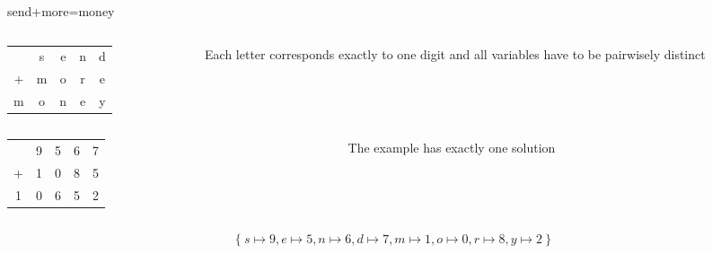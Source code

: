 \begin{frame}[c]{send+more=money}
  \begin{columns}
    \begin{column}{.35\textwidth}
      \begin{tabular}[t]{ccccc}
         &s&e&n&d\\
        +&m&o&r&e\\
        \hline
        m&o&n&e&y
      \end{tabular}
    \end{column}
    \begin{column}{.35\textwidth}
      Each letter corresponds exactly to one digit and all variables have to be
      pairwisely distinct
    \end{column}
  \end{columns}
\pause
\bigskip\bigskip
  \begin{columns}
    \begin{column}{.35\textwidth}
      \begin{tabular}[t]{ccccc}
         &9&5&6&7\\
        +&1&0&8&5\\
        \hline
        1&0&6&5&2
      \end{tabular}
    \end{column}
    \begin{column}{.35\textwidth}
      The example has exactly one solution
    \end{column}
  \end{columns}
\[
\{\ s\mapsto9, e\mapsto5, n\mapsto6, d\mapsto7, m\mapsto1, o\mapsto0, r\mapsto8, y\mapsto2\ \}
\]
\end{frame}
